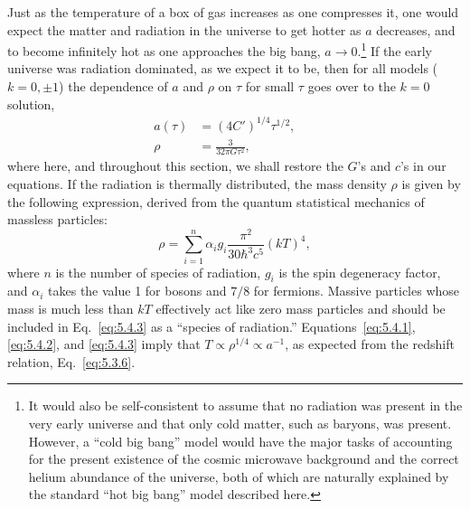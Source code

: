 Just as the temperature of a box of gas increases as one compresses it, one would
expect the matter and radiation in the universe to get hotter as \(a\) decreases, and to
become infinitely hot as one approaches the big bang, \(a\to0\).\footnote{It would
also be self-consistent to assume that no radiation was present in the very early
universe and that only cold matter, such as baryons, was present. However, a ``cold
big bang'' model would have the major tasks of accounting for the present existence of
the cosmic microwave background and the correct helium abundance of the universe,
both of which are naturally explained by the standard ``hot big bang'' model described
here.} If the early universe was radiation dominated, as we expect it to be, then for
all models (\(k=0,\pm1\)) the dependence of \(a\) and \(\rho\) on \(\tau\) for small
\(\tau\) goes over to the \(k=0\) solution,
\begin{align}
  a(\tau)&=(4C')^{1/4}\tau^{1/2}, &&\tag{5.4.1}\label{eq:5.4.1}\\
  \rho&=\frac{3}{32\pi G\tau^2}, &&\tag{5.4.2}\label{eq:5.4.2}
\end{align}
where here, and throughout this section, we shall restore the \(G\)'s and \(c\)'s in
our equations. If the radiation is thermally distributed, the mass density \(\rho\) is
given by the following expression, derived from the quantum statistical mechanics of
massless particles:
\begin{equation}
  \rho=\sum_{i=1}^{n}\alpha_i g_i\frac{\pi^2}{30\hbar^3c^5}(kT)^4,
  \tag{5.4.3}\label{eq:5.4.3}
\end{equation}
where \(n\) is the number of species of radiation, \(g_i\) is the spin degeneracy
factor, and \(\alpha_i\) takes the value 1 for bosons and \(7/8\) for fermions.
Massive particles whose mass is much less than \(kT\) effectively act like zero mass
particles and should be included in Eq.~\eqref{eq:5.4.3} as a ``species of radiation.''
Equations~\eqref{eq:5.4.1}, \eqref{eq:5.4.2}, and \eqref{eq:5.4.3} imply that
\(T\propto\rho^{1/4}\propto a^{-1}\), as expected from the redshift relation,
Eq.~\eqref{eq:5.3.6}.

